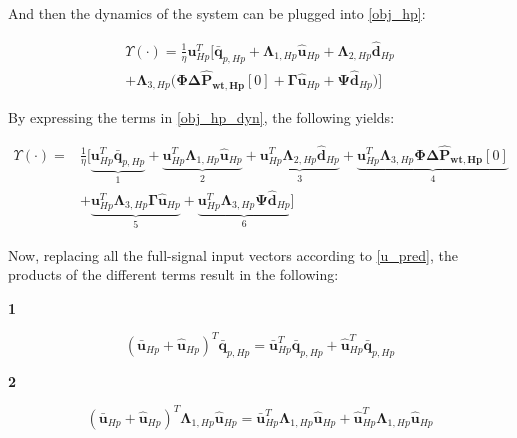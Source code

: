 And then the dynamics of the system can be plugged into \eqref{obj_hp}:

\begin{equation}
\begin{aligned}
 \Upsilon(\cdot) = \frac{1}{\eta} {\bm{{u}}}_{Hp}^{T}\bigg[ {\bm{\bar{q}}}_{p,Hp} + {\bm{\Lambda}}_{1,Hp} {\bm{\hat{u}}}_{Hp} + {\bm{\Lambda}}_{2,Hp} {\bm{\hat{d}}}_{Hp} 
   \\ + {\bm{\Lambda}}_{3,Hp} \bigg( \bm{\Phi} \bm{\Delta \hat{P}_{wt,Hp}}[0] + \bm{\Gamma} \bm{\hat{u}}_{Hp} + \bm{\Psi}\bm{\hat{d}}_{Hp} \bigg) \bigg]
\end{aligned}
\label{obj_hp_dyn}
\end{equation}

By expressing the terms in \eqref{obj_hp_dyn}, the following yields:

\begin{equation}
\begin{aligned} 
 \Upsilon(\cdot) = & \frac{1}{\eta} \bigg[ \underbrace{{\bm{{u}}}_{Hp}^{T}{\bm{\bar{q}}}_{p,Hp}}_{1} + \underbrace{{\bm{{u}}}_{Hp}^{T}{\bm{\Lambda}}_{1,Hp} {\bm{\hat{u}}}_{Hp}}_{2} + \underbrace{{\bm{{u}}}_{Hp}^{T}{\bm{\Lambda}}_{2,Hp} {\bm{\hat{d}}}_{Hp} 
 }_{3} + \underbrace{{\bm{{u}}}_{Hp}^{T}{\bm{\Lambda}}_{3,Hp}\bm{\Phi} \bm{\Delta \hat{P}_{wt,Hp}}[0]}_{4}
 \\
 & + \underbrace{{\bm{{u}}}_{Hp}^{T}{\bm{\Lambda}}_{3,Hp}\bm{\Gamma} \bm{\hat{u}}_{Hp}}_{5} + \underbrace{{\bm{{u}}}_{Hp}^{T}{\bm{\Lambda}}_{3,Hp}\bm{\Psi}\bm{\hat{d}}_{Hp}}_{6} \bigg]
 \end{aligned}
\end{equation}

Now, replacing all the full-signal input vectors according to \eqref{u_pred}, the products of the different terms result in the following: 

\textbf{1}

\begin{equation}
 ({\bm{\bar{u}}}_{Hp} + {\bm{\hat{u}}}_{Hp})^{T} \bm{\bar{q}}_{p,Hp}  = {\bm{\bar{u}}}_{Hp}^{T} \bm{\bar{q}}_{p,Hp} + {\bm{\hat{u}}}_{Hp}^{T} \bm{\bar{q}}_{p,Hp}
\end{equation}

\textbf{2}

\begin{equation}
 ({\bm{\bar{u}}}_{Hp} + {\bm{\hat{u}}}_{Hp})^{T} {\bm{\Lambda}}_{1,Hp}{\bm{\hat{u}}_{Hp}}  = {\bm{\bar{u}}}_{Hp}^{T} {\bm{\Lambda}}_{1,Hp} {\bm{\hat{u}}_{Hp}} + {\bm{\hat{u}}}_{Hp}^{T} {\bm{\Lambda}}_{1,Hp} {\bm{\hat{u}}_{Hp}} 
\end{equation}

